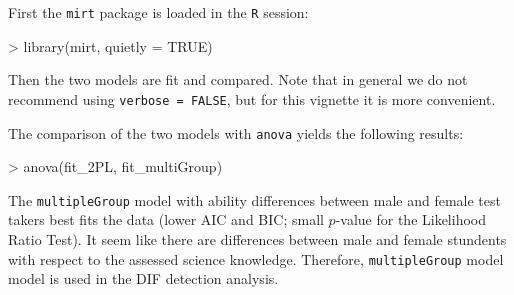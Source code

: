 \documentclass{article}
\begin{document}
First the {\tt mirt} package is loaded in the {\tt R} session:

\begin{Schunk}
\begin{Sinput}
> library(mirt, quietly = TRUE)
\end{Sinput}
\end{Schunk}

Then the two models are fit and compared. Note that in general we do not recommend using {\tt verbose = FALSE}, but for this vignette it is more convenient.


\begin{Schunk}
\end{Schunk}



The comparison of the two models with {\tt anova} yields the following results: 


\begin{Schunk}
\begin{Sinput}
> anova(fit_2PL, fit_multiGroup)                                      
\end{Sinput}
\end{Schunk}

The {\tt multipleGroup} model with ability differences between male and female test takers best fits the data (lower AIC and BIC; small $p$-value for the Likelihood Ratio Test). It seem like there are differences between male and female stundents with respect to the assessed science knowledge. Therefore, {\tt multipleGroup} model  model is used in the DIF detection analysis. 
\end{document}
